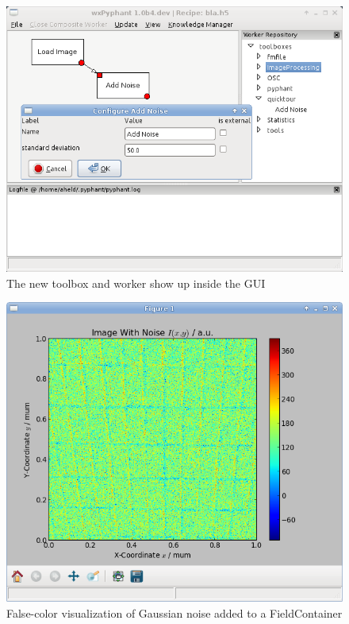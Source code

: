 \documentclass[a4paper]{article}
\begin{document}
\begin{figure}[h]
  \centering
  \includegraphics[scale=0.75]{fig/gui_addnoise_worker.png}
  \caption{The new toolbox and worker show up inside the GUI}
  \label{fig:gui_addnoise_worker}
\end{figure}
\begin{figure}[h]
  \centering
  \includegraphics[scale=0.75]{fig/gui_vis_noise.png}
  \caption{False-color visualization of Gaussian noise added to a
    FieldContainer}
  \label{fig:gui_vis_noise}
\end{figure}
\end{document}
